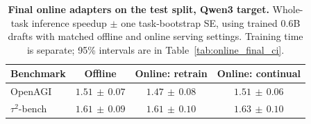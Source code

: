 \begin{table}[htbp]
\centering\small\setlength{\tabcolsep}{7pt}
\caption{\textbf{Final online adapters on the test split, Qwen3 target.} Whole-task inference
speedup $\pm$ one task-bootstrap SE, using trained 0.6B drafts with matched offline and online serving settings. Training time is separate; 95\% intervals are in Table~\ref{tab:online_final_ci}.}
\label{tab:online_final}
\begin{tabular}{lccc}
\toprule
Benchmark & Offline & Online: retrain & Online: continual \\
\midrule
OpenAGI & $1.51\,\pm\,0.07$ & $1.47\,\pm\,0.08$ & $1.51\,\pm\,0.06$ \\
$\tau^2$-bench & $1.61\,\pm\,0.09$ & $1.61\,\pm\,0.10$ & $1.63\,\pm\,0.10$ \\
\bottomrule
\end{tabular}
\end{table}
